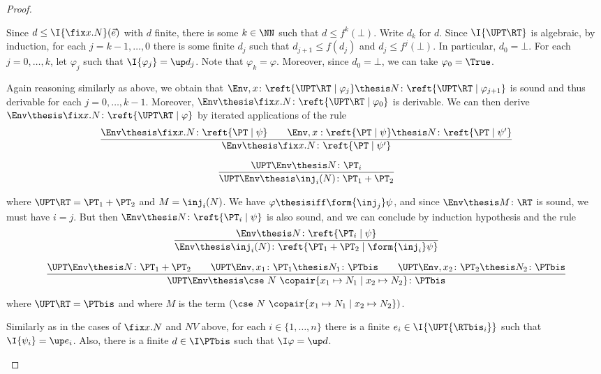 \begin{proof}
\begin{description}
Since $d \leq \I{\fix x.N}(\vec e)$ with $d$ finite,
there is some $k \in \NN$
such that
$d \leq f^k(\bot)$.
Write $d_k$ for $d$.
Since $\I{\UPT\RT}$ is algebraic,
by induction, for each $j = k-1,\dots,0$
there is some finite $d_j$ such that 
$d_{j+1} \leq f(d_j)$
and
$d_j \leq f^{j}(\bot)$.
In particular, $d_0 = \bot$.
For each $j = 0,\dots,k$,
let $\varphi_j$ such that $\I{\varphi_j} = \up d_j$.
Note that $\varphi_k = \varphi$.
Moreover, since $d_0 = \bot$,
we can take $\varphi_0 = \True$.

Again reasoning similarly as above,
we obtain that 
\(
  \Env, x \colon \reft{\UPT\RT \mid \varphi_j} \thesis
  N \colon \reft{\UPT\RT \mid \varphi_{j+1}}
\)
is sound and thus derivable for each $j = 0,\dots,k-1$.
Moreover,
$\Env \thesis \fix x.N \colon \reft{\UPT\RT \mid \varphi_0}$
is derivable.
We can then derive $\Env \thesis \fix x.N \colon \reft{\UPT\RT \mid \varphi}$
by iterated applications of the rule
\[
\dfrac{\Env \thesis \fix x.N \colon \reft{\PT \mid \psi}
  \qquad
  \Env, x: \reft{\PT \mid \psi} \thesis N \colon \reft{\PT \mid \psi'}}
  {\Env \thesis \fix x.N \colon \reft{\PT \mid \psi'}}
\]


\item[Case of]
\[
\dfrac{\UPT\Env \thesis N \colon \PT_i}
  {\UPT\Env \thesis \inj_i(N) \colon \PT_1 + \PT_2}
\]

\noindent
where $\UPT\RT = \PT_1 + \PT_2$ and $M = \inj_i(N)$.
We have $\varphi \thesisiff \form{\inj_j}\psi$,
and since $\Env \thesis M\colon \RT$ is sound,
we must have $i = j$.
But then $\Env \thesis N \colon \reft{\PT_i \mid \psi}$
is also sound, and we can conclude by induction hypothesis and
the rule
\[
\dfrac{\Env \thesis N \colon \reft{\PT_i \mid \psi}}
  {\Env \thesis \inj_i(N) \colon \reft{\PT_1 + \PT_2 \mid \form{\inj_i} \psi}}
\]

\item[Case of]
\[
\dfrac{\UPT\Env \thesis N \colon \PT_1 + \PT_2
  \qquad \UPT\Env, x_1 \colon \PT_1 \thesis N_1 \colon \PTbis
  \qquad \UPT\Env, x_2 \colon \PT_2 \thesis N_2 \colon \PTbis}
  {\UPT\Env \thesis \cse\ N\ \copair{x_1 \mapsto N_1 \mid x_2 \mapsto N_2} \colon \PTbis}
\]

\noindent
where $\UPT\RT = \PTbis$
and where $M$ is the term
$(\cse\ N\ \copair{x_1 \mapsto N_1 \mid x_2 \mapsto N_2})$.

Similarly as in the cases of $\fix x.N$ and $N V$ above,
for each $i \in \{1,\dots,n\}$
there is a finite $e_i \in \I{\UPT{\RTbis_i}}$
such that $\I{\psi_i} = \up e_i$.
Also, there is a finite $d \in \I\PTbis$ such that $\I\varphi = \up d$.


\end{description}
\end{proof}
